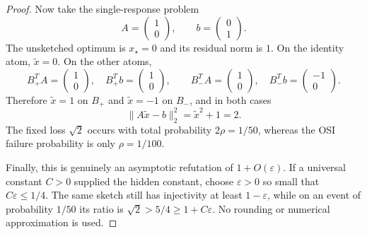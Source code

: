 \begin{cxrefutation}
\begin{proof}
Now take the single-response problem
\[
 A=\begin{pmatrix}1\\0\end{pmatrix},\qquad
 b=\begin{pmatrix}0\\1\end{pmatrix}.
\]
The unsketched optimum is $x_\star=0$ and its residual norm is $1$.  On the
identity atom, $\widetilde x=0$.  On the other atoms,
\[
 B_+^TA=\begin{pmatrix}1\\0\end{pmatrix},\quad
 B_+^Tb=\begin{pmatrix}1\\0\end{pmatrix},\qquad
 B_-^TA=\begin{pmatrix}1\\0\end{pmatrix},\quad
 B_-^Tb=\begin{pmatrix}-1\\0\end{pmatrix}.
\]
Therefore $\widetilde x=1$ on $B_+$ and $\widetilde x=-1$ on $B_-$, and in
both cases
\[
 \|A\widetilde x-b\|_2^2=\widetilde x^2+1=2.
\]
The fixed loss $\sqrt2$ occurs with total probability $2\rho=1/50$, whereas
the OSI failure probability is only $\rho=1/100$.

Finally, this is genuinely an asymptotic refutation of $1+O(\varepsilon)$.
If a universal constant $C>0$ supplied the hidden constant, choose
$\varepsilon>0$ so small that $C\varepsilon\leq1/4$.  The same sketch still
has injectivity at least $1-\varepsilon$, while on an event of probability
$1/50$ its ratio is $\sqrt2>5/4\geq1+C\varepsilon$.  No rounding or numerical
approximation is used.
\end{proof}
\end{cxrefutation}

